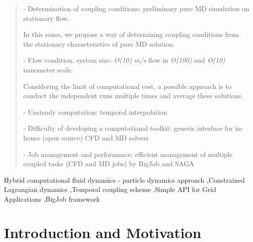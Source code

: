 \documentclass[preprint,12pt]{elsarticle}
\begin{document}
\begin{frontmatter}
\begin{abstract}
- Determination of coupling conditions: preliminary pure MD simulation on stationary flow.

In this sense, we propose a way of determining coupling conditions from the stationary characteristics of pure MD solution.

- Flow condition, system size: {\it{O(10) m/s}} flow in {\it{O(100)}} and {\it{O(10)}} nanometer scale.

Considering the limit of computational cost, a possible approach is to conduct the independent runs multiple times and average these solutions.

- Unsteady computation: temporal interpolation
 
- Difficulty of developing a computational toolkit: generic interface for in-house (open source) CFD and MD solvers

- Job management and performance: efficient management of multiple coupled tasks (CFD and MD jobs) by BigJob and SAGA

\end{abstract}

\begin{keyword}
Hybrid computational fluid dynamics - particle dynamics approach \sep Constrained Lagrangian dynamics \sep Temporal coupling scheme \sep Simple API for Grid Applications \sep BigJob framework
\end{keyword}

\end{frontmatter}








\section{Introduction and Motivation}
\end{document}
